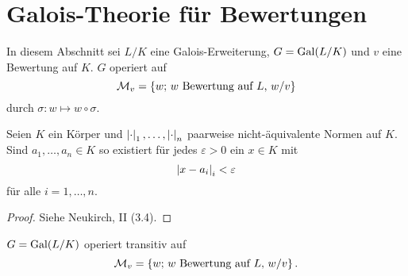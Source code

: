

\section{Galois-Theorie für Bewertungen}


\begin{setting}
	In diesem Abschnitt sei $L/K$ eine Galois-Erweiterung, $G= \operatorname{Gal}(L/K)$ und $v$ eine Bewertung auf $K$. $G$ operiert auf
	\[ \mathcal{M}_v = \left\{
	w; \, \text{$w$ Bewertung auf $L$, $w/v$}
	\right\}
	\]
	durch $\sigma \colon w \mapsto w \circ \sigma$.
\end{setting}

\begin{Prop}[Approximationssatz]
	Seien $K$ ein Körper und $\left|{\cdot}\right|_1, \dots, \left|{\cdot}\right|_n$ paarweise nicht-äquivalente Normen auf $K$.
	Sind $a_1,\dots, a_n \in K$ so existiert für jedes $\varepsilon>0$ ein $x \in K$ mit
	\[ \left|{x-a_i}\right|_i < \varepsilon
	\]
	für alle $i=1,\dots,n$.
\end{Prop}

\begin{proof}
Siehe Neukirch, II (3.4).
\end{proof}

\begin{Prop}
	$G=\operatorname{Gal}(L/K)$ operiert transitiv auf 
	\[ \mathcal{M}_v = \left\{
	w; \, \text{$w$ Bewertung auf $L$, $w/v$}
	\right\}.
	\]
\end{Prop}

